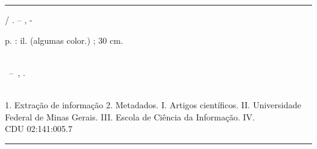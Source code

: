 \documentclass[
	12pt,               %
	openright,          %
	twoside,            %
	a4paper,            %
	english,            %
	brazil              %
	]{abntex2}
\begin{document}
\frenchspacing 


\imprimircapa

\imprimirfolhaderosto*


%
%     
\begin{fichacatalografica}
	\vspace*{\fill}                 %
	\hrule                          %
	\begin{center}                  %
	\begin{minipage}[c]{12.5cm}     %
	
	\imprimirautor
	
	\hspace{0.5cm} \imprimirtitulo  / \imprimirautor. --
	\imprimirlocal, \imprimirdata-
	
	\hspace{0.5cm} \pageref{LastPage} p. : il. (algumas color.) ; 30 cm.\\
	
	\hspace{0.5cm} \imprimirorientadorRotulo~\imprimirorientador\\
	
	\hspace{0.5cm}
	\parbox[t]{\textwidth}{\imprimirtipotrabalho~--~\imprimirinstituicao,
	\imprimirdata.}\\
	
	\hspace{0.5cm}
		1. Extração de informação
		2. Metadados.
		I. Artigos científicos.
		II. Universidade Federal de Minas Gerais.
		III. Escola de Ciência da Informação.
		IV. \imprimirtitulo\\            
	
	\hspace{8.75cm} CDU 02:141:005.7\\
	
	\end{minipage}
	\end{center}
	\hrule
\end{fichacatalografica}
\end{document}
